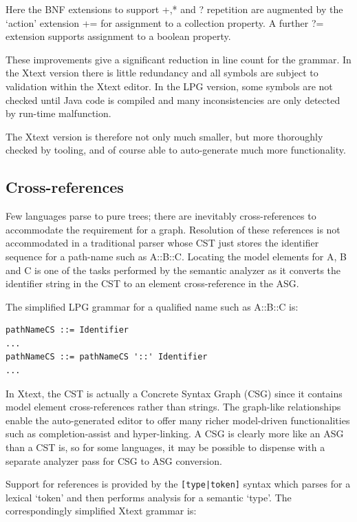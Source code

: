 \documentclass{eceasst}
\begin{document}
Here the BNF extensions to support +,* and ? repetition are augmented by the `action' extension += for assignment to a collection property. A further ?= extension supports assignment to a boolean property.

These improvements give a significant reduction in line count for the grammar. In the Xtext version there is little redundancy and all symbols are subject to validation within the Xtext editor. In the LPG version, some symbols are not checked until Java code is compiled and many inconsistencies are only detected by run-time malfunction.

The Xtext version is therefore not only much smaller, but more thoroughly checked by tooling, and of course able to auto-generate much more functionality.

\subsection{Cross-references}

Few languages parse to pure trees; there are inevitably cross-references to accommodate the requirement for a graph. Resolution of these references is not accommodated in a traditional parser whose CST just stores the identifier sequence for a path-name such as A::B::C. Locating the model elements for A, B and C is one of the tasks performed by the semantic analyzer as it converts the identifier string in the CST to an element cross-reference in the ASG.

The simplified LPG grammar for a qualified name such as A::B::C is:

{\small\begin{verbatim}
pathNameCS ::= Identifier
...
pathNameCS ::= pathNameCS '::' Identifier
...
\end{verbatim}}        

In Xtext, the CST is actually a Concrete Syntax Graph (CSG) since it contains model element cross-references rather than strings. The graph-like relationships enable the auto-generated editor to offer many richer model-driven functionalities such as completion-assist and hyper-linking. A CSG is clearly more like an ASG than a CST is, so for some languages, it may be possible to dispense with a separate analyzer pass for CSG to ASG conversion.

Support for references is provided by the \verb+[type|token]+ syntax which parses for a lexical `token' and then performs analysis for a semantic `type'. The correspondingly simplified Xtext grammar is:
\end{document}
